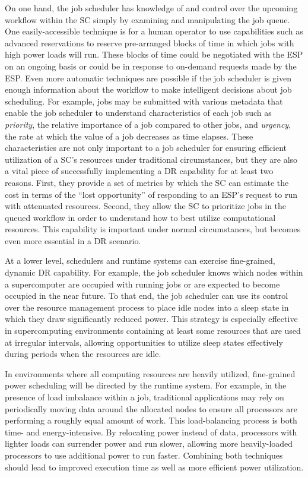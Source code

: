 On one hand, the job scheduler has knowledge of and control over the
upcoming workflow within the SC simply by examining
and manipulating the job queue. One easily-accessible technique is
for a human operator to use capabilities such as advanced reservations
to reserve pre-arranged blocks of time in which jobs with high power
loads will run. These blocks of time could be negotiated with the
ESP on an ongoing basis or could be in response to
on-demand requests made by the ESP. Even more
automatic techniques are possible if the job scheduler is given enough
information about the workflow to make intelligent decisions about job
scheduling. For example, jobs may be submitted with various metadata
that enable the job scheduler to understand characteristics of each
job such as \textit{priority}, the relative importance of a job
compared to other jobs, and \textit{urgency}, the rate at which the
value of a job decreases as time elapses. These characteristics are
not only important to a job scheduler for ensuring efficient
utilization of a SC's resources under traditional
circumstances, but they are also a vital piece of successfully
implementing a DR capability for at least two reasons.
First, they provide a set of metrics by which the SC
can estimate the cost in terms of the ``lost opportunity'' of
responding to an ESP's request to run with
attenuated resources. Second, they allow the SC to
prioritize jobs in the queued workflow in order to understand how to
best utilize computational resources. This capability is important
under normal circumstances, but becomes even more essential in a
DR scenario.

At a lower level, schedulers and runtime systems can exercise 
fine-grained, dynamic DR capability. 
For example, the job scheduler knows which
nodes within a supercomputer are occupied with running jobs or are
expected to become occupied in the near future. To that end, the job
scheduler can use its control over the resource management process to
place idle nodes into a sleep state in which they draw significantly
reduced power. This strategy is especially effective in supercomputing
environments containing at least some resources that are used at
irregular intervals, allowing opportunities to utilize sleep states
effectively during periods when the resources are idle. 

In environments where all computing resources are heavily utilized,
fine-grained power scheduling will be directed by the runtime system.
For example, in the presence of load imbalance within a job, traditional
applications may rely on periodically moving data around the allocated
nodes to ensure all processors are performing a roughly equal amount
of work. This load-balancing process is both time- and energy-intensive.
By relocating power instead of data, processors with lighter loads can
surrender power and run slower, allowing more heavily-loaded processors
to use additional power to run faster. Combining both techniques 
should lead to improved execution time as well as more efficient
power utilization.

